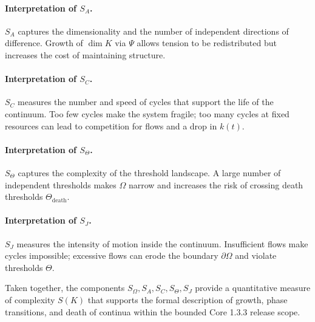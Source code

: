 \paragraph{Interpretation of \texorpdfstring{\(S_A\)}{S_A}.}
\(S_A\) captures the dimensionality and the number of independent directions of difference.
Growth of \(\dim K\) via \(\Psi\) allows tension to be redistributed but increases the cost of maintaining structure.

\paragraph{Interpretation of \texorpdfstring{\(S_C\)}{S_C}.}
\(S_C\) measures the number and speed of cycles that support the life of the continuum.
Too few cycles make the system fragile; too many cycles at fixed resources can lead to competition for flows and a drop in \(k(t)\).

\paragraph{Interpretation of \texorpdfstring{\(S_\Theta\)}{S_\Theta}.}
\(S_\Theta\) captures the complexity of the threshold landscape.
A large number of independent thresholds makes \(\Omega\) narrow and increases the risk of crossing death thresholds \(\Theta_{\mathrm{death}}\).

\paragraph{Interpretation of \texorpdfstring{\(S_J\)}{S_J}.}
\(S_J\) measures the intensity of motion inside the continuum.
Insufficient flows make cycles impossible; excessive flows can erode the boundary \(\partial\Omega\) and violate thresholds \(\Theta\).

Taken together, the components \(S_\Omega,S_A,S_C,S_\Theta,S_J\) provide a quantitative measure of complexity \(S(K)\) that supports the formal description of growth, phase transitions, and death of continua within the bounded Core 1.3.3 release scope.
